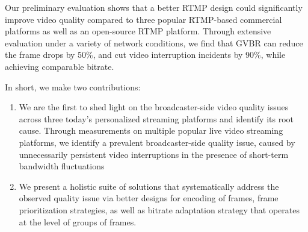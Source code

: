 Our preliminary evaluation shows that a better RTMP design
could significantly improve video quality compared to three popular
RTMP-based commercial  platforms as well as an open-source
RTMP platform.
Through extensive evaluation under a variety of network conditions, we find that
GVBR can reduce the frame drops by 50\%, and cut video interruption incidents
by 90\%, while achieving comparable bitrate.




In short, we make two contributions:
\begin{enumerate}
\item We are the first to shed light on the broadcaster-side video
quality issues across three today's personalized streaming platforms and
identify its root cause.
Through measurements on multiple popular live video streaming platforms,
we identify a prevalent broadcaster-side quality issue, caused
by unnecessarily persistent video interruptions in the presence of short-term
bandwidth fluctuations
\item We present a holistic suite of solutions that systematically address
the observed quality issue via better designs for encoding of frames,
frame prioritization strategies, as well as bitrate adaptation strategy that
operates at the level of groups of frames.

\end{enumerate}


